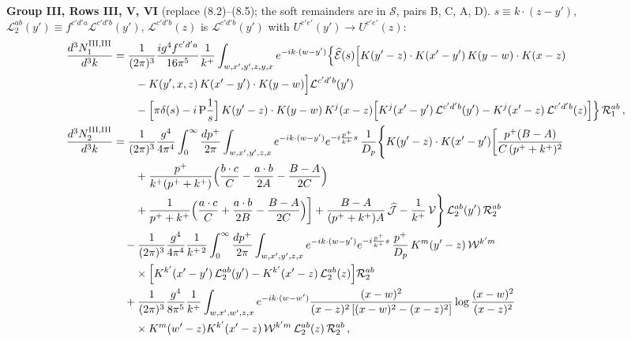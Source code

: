 \noindent\textbf{Group III, Rows III, V, VI} (replace (8.2)--(8.5); the soft remainders are in $\mathcal{S}$, pairs B, C, A, D). $s\equiv k\cdot(z-y')$, $\mathcal{L}_{2}^{ab}(y')\equiv f^{c'd'a}\mathcal{L}^{c'd'b}(y')$, $\mathcal{L}^{c'd'b}(z)$ is $\mathcal{L}^{c'd'b}(y')$ with $U^{c'e'}(y')\to U^{c'e'}(z)$:
\begin{align}
\frac{d^{3}N^{\rm III,III}_{1}}{d^{3}k}&=\frac{1}{(2\pi)^{3}}\frac{ig^{4}f^{c'd'a}}{16\pi^{5}}\frac{1}{k^{+}}\int_{w,x',y',z,y,x}e^{-ik\cdot(w-y')}\Big\{\widehat{\mathcal{E}}(s)\Big[K(y'-z)\cdot K(x'-y')\,K(y-w)\cdot K(x-z)\notag\\&\qquad-K(y',x,z)\,K(x'-y')\cdot K(y-w)\Big]\mathcal{L}^{c'd'b}(y')\notag\\
&\qquad-\Big[\pi\delta(s)-i\,{\rm P}\frac1s\Big]\,K(y'-z)\cdot K(y-w)\,K^{j}(x-z)\Big[K^{j}(x'-y')\,\mathcal{L}^{c'd'b}(y')-K^{j}(x'-z)\,\mathcal{L}^{c'd'b}(z)\Big]\Big\}\,\mathcal{R}_{1}^{ab}\,,\label{sf:G3R31}\\
\frac{d^{3}N^{\rm III,III}_{2}}{d^{3}k}&=\frac{1}{(2\pi)^{3}}\frac{g^{4}}{4\pi^{4}}\int_{0}^{\infty}\frac{dp^{+}}{2\pi}\int_{w,x',y',z,x}e^{-ik\cdot(w-y')}e^{-i\frac{p^{+}}{k^{+}}s}\,\frac{1}{D_{p}}\Bigg\{K(y'-z)\cdot K(x'-y')\bigg[\frac{p^{+}(B-A)}{C\,(p^{+}+k^{+})^{2}}\notag\\&\qquad+\frac{p^{+}}{k^{+}(p^{+}+k^{+})}\Big(\frac{b\cdot c}{C}-\frac{a\cdot b}{2A}-\frac{B-A}{2C}\Big)\notag\\
&\qquad+\frac{1}{p^{+}+k^{+}}\Big(\frac{a\cdot c}{C}+\frac{a\cdot b}{2B}-\frac{B-A}{2C}\Big)\bigg]+\frac{B-A}{(p^{+}+k^{+})A}\,\widehat{\mathcal{J}}-\frac{1}{k^{+}}\,\mathcal{V}\Bigg\}\,\mathcal{L}_{2}^{ab}(y')\,\mathcal{R}_{2}^{ab}\notag\\
&\quad-\frac{1}{(2\pi)^{3}}\frac{g^{4}}{4\pi^{4}}\frac{1}{k^{+\,2}}\int_{0}^{\infty}\frac{dp^{+}}{2\pi}\int_{w,x',y',z,x}e^{-ik\cdot(w-y')}e^{-i\frac{p^{+}}{k^{+}}s}\,\frac{p^{+}}{D_{p}}\,K^{m}(y'-z)\,\mathcal{W}^{k'm}\notag\\&\qquad\times\Big[K^{k'}(x'-y')\,\mathcal{L}_{2}^{ab}(y')-K^{k'}(x'-z)\,\mathcal{L}_{2}^{ab}(z)\Big]\mathcal{R}_{2}^{ab}\notag\\
&\quad+\frac{1}{(2\pi)^{3}}\frac{g^{4}}{8\pi^{5}}\frac{1}{k^{+}}\int_{w,x',w',z,x}e^{-ik\cdot(w-w')}\frac{(x-w)^{2}}{(x-z)^{2}\left[(x-w)^{2}-(x-z)^{2}\right]}\log\frac{(x-w)^{2}}{(x-z)^{2}}\notag\\&\qquad\times K^{m}(w'-z)K^{k'}(x'-z)\,\mathcal{W}^{k'm}\,\mathcal{L}_{2}^{ab}(z)\,\mathcal{R}_{2}^{ab}\,,\label{sf:G3R32}
\end{align}
